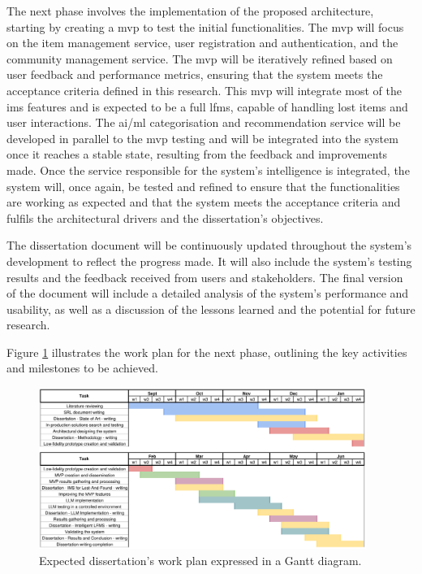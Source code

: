 The next phase involves the implementation of the proposed architecture, starting by creating a \ac{mvp} to test the initial functionalities. The \ac{mvp} will focus on the item management service, user registration and authentication, and the community management service. The \ac{mvp} will be iteratively refined based on user feedback and performance metrics, ensuring that the system meets the acceptance criteria defined in this research. This \ac{mvp} will integrate most of the \ac{ims} features and is expected to be a full \ac{lfms}, capable of handling lost items and user interactions. The \ac{ai}/\ac{ml} categorisation and recommendation service will be developed in parallel to the \ac{mvp} testing and will be integrated into the system once it reaches a stable state, resulting from the feedback and improvements made. Once the service responsible for the system's intelligence is integrated, the system will, once again, be tested and refined to ensure that the functionalities are working as expected and that the system meets the acceptance criteria and fulfils the architectural drivers and the dissertation's objectives.

The dissertation document will be continuously updated throughout the system's development to reflect the progress made. It will also include the system's testing results and the feedback received from users and stakeholders. The final version of the document will include a detailed analysis of the system's performance and usability, as well as a discussion of the lessons learned and the potential for future research.

Figure \ref{fig:gantt_diagram} illustrates the work plan for the next phase, outlining the key activities and milestones to be achieved.

\begin{figure}[!htb]
    \includegraphics[width=0.95\textwidth]{figs/chapter3/gantt_diagram.png}
    \centering
    \caption[Expected dissertation's work plan expressed in a Gantt diagram]{Expected dissertation's work plan expressed in a Gantt diagram.}
    \label{fig:gantt_diagram}
\end{figure}

